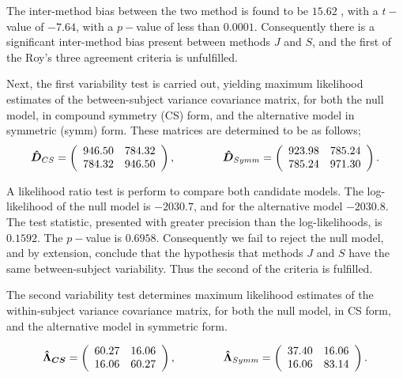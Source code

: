 \documentclass[12pt, a4paper]{article}
\theoremstyle{plain}
\theoremstyle{definition}
\theoremstyle{remark}
\begin{document}
The inter-method bias between the two method is found to be $15.62$ , with a $t-$value of $-7.64$, with a $p-$value of less than $0.0001$. Consequently there is a significant inter-method bias present between methods $J$ and $S$, and the first of the Roy's three agreement criteria is unfulfilled.

Next, the first variability test is carried out, yielding maximum likelihood estimates of the between-subject variance covariance matrix, for both the null model, in compound symmetry (CS) form, and the alternative model in symmetric (symm) form. These matrices are determined to be as follows;
\[
\boldsymbol{\hat{D}}_{CS} = \left( \begin{array}{cc}
    946.50 & 784.32  \\
    784.32 & 946.50  \\
    \end{array}\right),
\hspace{1.5cm}
    \boldsymbol{\hat{D}}_{Symm} = \left( \begin{array}{cc}
    923.98 & 785.24  \\
    785.24 & 971.30  \\
    \end{array}\right).
\]

A likelihood ratio test is perform to compare both candidate models. The log-likelihood of the null model is $-2030.7$, and for the alternative model $-2030.8$. The test statistic, presented with greater precision than the log-likelihoods, is $0.1592$. The $p-$value is $0.6958$. Consequently we fail to reject the null model, and by extension, conclude that the hypothesis that methods $J$ and $S$ have the same between-subject variability. Thus the second of the criteria is fulfilled.

The second variability test determines maximum likelihood estimates of the within-subject variance covariance matrix, for both the null model, in CS form, and the alternative model in symmetric form.

\[
\boldsymbol{\hat{\Lambda}_{CS}} = \left( \begin{array}{cc}
    60.27  & 16.06  \\
    16.06  & 60.27  \\
    \end{array}\right),
\hspace{1.5cm}
\boldsymbol{\hat{\Lambda}}_{Symm} = \left( \begin{array}{cc}
    37.40 & 16.06  \\
    16.06 & 83.14  \\
    \end{array}\right).
\]
\end{document}
